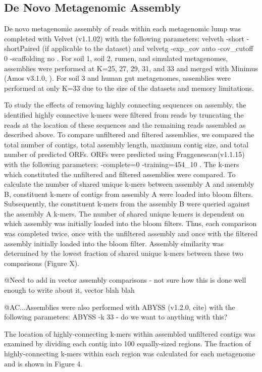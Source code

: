 \documentclass[11pt]{article} %
\begin{document}
\subsection{De Novo Metagenomic Assembly}
De novo metagenomic assembly of reads within each metagenomic lump was completed with Velvet (v1.1.02) with the following parameters: velveth -short -shortPaired (if applicable to the dataset) and velvetg -exp\_cov auto -cov\_cutoff 0 -scaffolding no \cite{Zerbino:2008p665}.  For soil 1, soil 2, rumen, and simulated metagenomes, assemblies were performed at K=25, 27, 29, 31, and 33 and merged with Minimus (Amos v3.1.0, \cite{Sommer:2007p1253}).  For soil 3 and human gut metagenomes, assemblies were performed at only K=33 due to the size of the datasets and memory limitations.  

To study the effects of removing highly connecting sequences on assembly, the identified highly connective k-mers were filtered from reads by truncating the reads at the location of these sequences and the remaining reads assembled as described above.  To compare unfiltered and filtered assemblies, we compared the total number of contigs, total assembly length, maximum contig size, and total number of predicted ORFs.  ORFs were predicted using Fraggenescan(v1.1.15) with the following parameters: -complete=0 -training=454\_10 \cite{Rho:2010p397}.  The k-mers which constituted the unfiltered and filtered assemblies were compared.  To calculate the number of shared unique k-mers between assembly A and assembly B, constituent k-mers of contigs from assembly A were loaded into bloom filters. Subsequently, the constituent k-mers from the assembly B were queried against the assembly A k-mers. The number of shared unique k-mers is dependent on which assembly was initially loaded into the bloom filters. Thus, each comparison was completed twice, once with the unfiltered assembly and once with the filtered assembly initially loaded into the bloom filter. Assembly similarity was determined by the lowest fraction of shared unique k-mers between these two comparisons (Figure X). 

@Need to add in vector assembly comparisons - not sure how this is done well enough to write about it, vector blah blah

@AC...Assemblies were also performed with ABYSS (v1.2.0, cite) with the following parameters: ABYSS -k 33  - do we want to anything with this?

The location of highly-connecting k-mers within assembled unfiltered contigs was examined by dividing each contig into 100 equally-sized regions.  The fraction of highly-connecting k-mers within each region was calculated for each metagenome and is shown in Figure 4.
\end{document}
